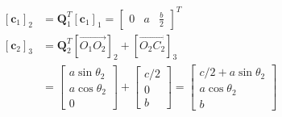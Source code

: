 \documentclass[conference]{IEEEtran}
\begin{document}
\begin{align*}
    \left[\mathbf{c}_1\right]_2 & = \mathbf{Q}_1^T\left[\mathbf{c}_1\right]_1=\left[\begin{array}{lll}
                                                                                            0 & a & \frac{b}{2}
                                                                                        \end{array}\right]^T                                        \\
    \left[\mathbf{c}_2\right]_3 & = \mathbf{Q}_2^T\left[\overrightarrow{O_1 O_2}\right]_2+\left[\overrightarrow{O_2 C_2}\right]_3               \\
                                & =                               \left[\begin{array}{c}
                                                                                a \sin \theta_2 \\
                                                                                a \cos \theta_2 \\
                                                                                0
                                                                            \end{array}\right]+\left[\begin{array}{c}
                                                                                                         c / 2 \\
                                                                                                         0     \\
                                                                                                         b
                                                                                                     \end{array}\right]=\left[\begin{array}{c}
                                                                                                                                  c / 2+a \sin \theta_2 \\
                                                                                                                                  a \cos \theta_2       \\
                                                                                                                                  b
                                                                                                                              \end{array}\right]
\end{align*}
\end{document}
